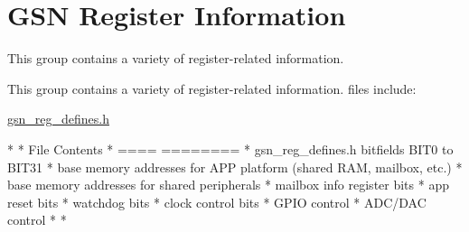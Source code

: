\hypertarget{a00629}{
\section{GSN Register Information}
\label{a00629}
}


This group contains a variety of register-\/related information.  


This group contains a variety of register-\/related information. files include:\par
 \hyperlink{a00546}{gsn\_\-reg\_\-defines.h}

\begin{DoxyVerb}
 *
 * File					Contents
 * ====					========
 * gsn_reg_defines.h	bitfields BIT0 to BIT31
 *                      base memory addresses for APP platform (shared RAM, mailbox, etc.)
 *                      base memory addresses for shared peripherals
 *                      mailbox info register bits
 *                      app reset bits
 *                      watchdog bits
 *                      clock control bits
 *                      GPIO control
 *                      ADC/DAC control
 *
 * \end{DoxyVerb}
 